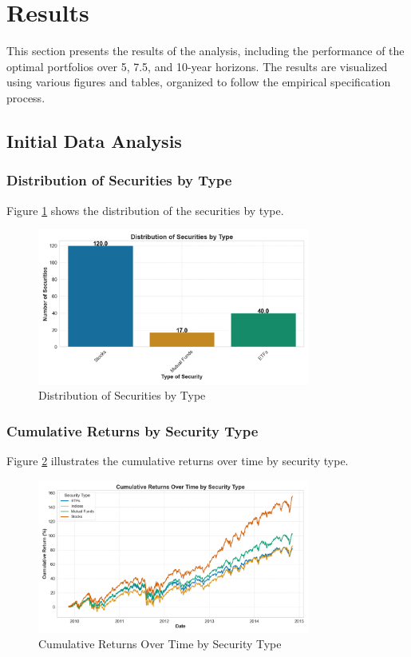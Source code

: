\section{Results}

This section presents the results of the analysis, including the performance of the optimal portfolios over 5, 7.5, and 10-year horizons. The results are visualized using various figures and tables, organized to follow the empirical specification process.

\subsection{Initial Data Analysis}

\subsubsection{Distribution of Securities by Type}
Figure \ref{fig:distribution_of_securities} shows the distribution of the securities by type.

\begin{figure}[!htbp]
    \centering
    \includegraphics[width=0.8\textwidth]{../Figures/histogram_security_count.png}
    \caption{Distribution of Securities by Type}
    \label{fig:distribution_of_securities}
\end{figure}

\subsubsection{Cumulative Returns by Security Type}
Figure \ref{fig:cumulative_returns_by_type} illustrates the cumulative returns over time by security type.

\begin{figure}[!htbp]
    \centering
    \includegraphics[width=0.8\textwidth]{../Figures/cumulative_returns_by_type.png}
    \caption{Cumulative Returns Over Time by Security Type}
    \label{fig:cumulative_returns_by_type}
\end{figure}

